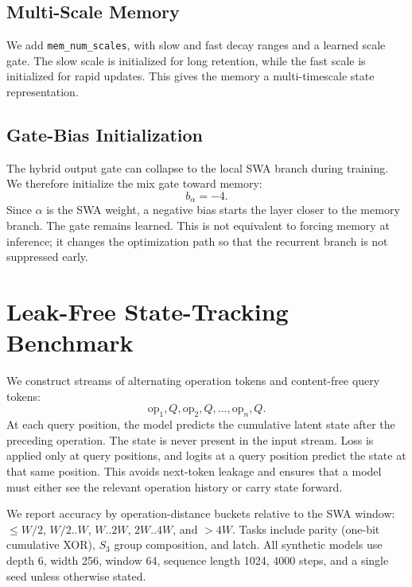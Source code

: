 \documentclass[letterpaper]{article}
\begin{document}
\subsection{Multi-Scale Memory}

We add \texttt{mem\_num\_scales}, with slow and fast decay ranges and a learned scale gate. The slow scale is initialized for long retention, while the fast scale is initialized for rapid updates. This gives the memory a multi-timescale state representation.

\subsection{Gate-Bias Initialization}

The hybrid output gate can collapse to the local SWA branch during training. We therefore initialize the mix gate toward memory:
\begin{equation}
  b_\alpha = -4.
\end{equation}
Since $\alpha$ is the SWA weight, a negative bias starts the layer closer to the memory branch. The gate remains learned. This is not equivalent to forcing memory at inference; it changes the optimization path so that the recurrent branch is not suppressed early.

\section{Leak-Free State-Tracking Benchmark}

We construct streams of alternating operation tokens and content-free query tokens:
\begin{equation}
  \mathrm{op}_1, Q, \mathrm{op}_2, Q, \ldots, \mathrm{op}_n, Q.
\end{equation}
At each query position, the model predicts the cumulative latent state after the preceding operation. The state is never present in the input stream. Loss is applied only at query positions, and logits at a query position predict the state at that same position. This avoids next-token leakage and ensures that a model must either see the relevant operation history or carry state forward.

We report accuracy by operation-distance buckets relative to the SWA window: $\le W/2$, $W/2..W$, $W..2W$, $2W..4W$, and $>4W$. Tasks include parity (one-bit cumulative XOR), $S_3$ group composition, and latch. All synthetic models use depth 6, width 256, window 64, sequence length 1024, 4000 steps, and a single seed unless otherwise stated.
\end{document}

